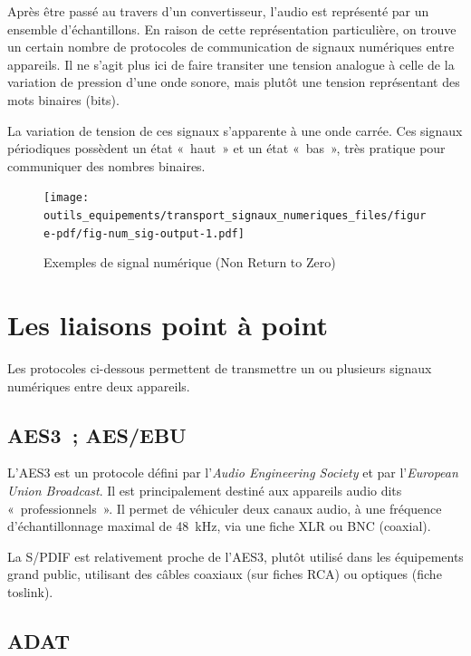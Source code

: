 \documentclass[
  letterpaper,
  DIV=11,
  numbers=noendperiod]{scrreprt}
\begin{document}
Après être passé au travers d'un convertisseur, l'audio est représenté
par un ensemble d'échantillons. En raison de cette représentation
particulière, on trouve un certain nombre de protocoles de communication
de signaux numériques entre appareils. Il ne s'agit plus ici de faire
transiter une tension analogue à celle de la variation de pression d'une
onde sonore, mais plutôt une tension représentant des mots binaires
(bits).

La variation de tension de ces signaux s'apparente à une onde carrée.
Ces signaux périodiques possèdent un état «~haut~» et un état «~bas~»,
très pratique pour communiquer des nombres binaires.

\begin{figure}

{\centering \texttt{[image: outils\_equipements/transport\_signaux\_numeriques\_files/figure-pdf/fig-num\_sig-output-1.pdf]}

}

\caption{\label{fig-num_sig}Exemples de signal numérique (Non Return to
Zero)}

\end{figure}

\hypertarget{les-liaisons-point-uxe0-point}{%
\section{Les liaisons point à
point}\label{les-liaisons-point-uxe0-point}}

Les protocoles ci-dessous permettent de transmettre un ou plusieurs
signaux numériques entre deux appareils.

\hypertarget{aes3-aesebu}{%
\subsection{AES3~; AES/EBU}\label{aes3-aesebu}}

L'AES3 est un protocole défini par l'\emph{Audio Engineering Society} et
par l'\emph{European Union Broadcast}. Il est principalement destiné aux
appareils audio dits «~professionnels~». Il permet de véhiculer deux
canaux audio, à une fréquence d'échantillonnage maximal de 48~kHz, via
une fiche XLR ou BNC (coaxial).

La S/PDIF est relativement proche de l'AES3, plutôt utilisé dans les
équipements grand public, utilisant des câbles coaxiaux (sur fiches RCA)
ou optiques (fiche toslink).

\hypertarget{adat}{%
\subsection{ADAT}\label{adat}}
\end{document}
